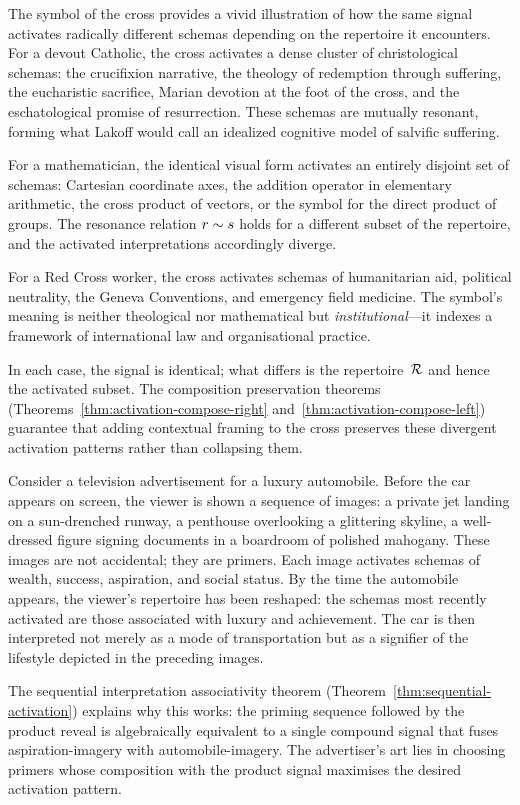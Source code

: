 \begin{example}
\label{ex:cross-multi-activation}
The symbol of the cross provides a vivid illustration of how the same
signal activates radically different schemas depending on the
repertoire it encounters.  For a devout Catholic, the cross activates
a dense cluster of christological schemas: the crucifixion narrative,
the theology of redemption through suffering, the eucharistic
sacrifice, Marian devotion at the foot of the cross, and the
eschatological promise of resurrection.  These schemas are mutually
resonant, forming what Lakoff would call an idealized cognitive model
of salvific suffering.

For a mathematician, the identical visual form activates an entirely
disjoint set of schemas: Cartesian coordinate axes, the addition
operator in elementary arithmetic, the cross product of vectors, or
the symbol for the direct product of groups.  The resonance relation
$r \sim s$ holds for a different subset of the repertoire, and the
activated interpretations accordingly diverge.

For a Red Cross worker, the cross activates schemas of humanitarian
aid, political neutrality, the Geneva Conventions, and emergency field
medicine.  The symbol's meaning is neither theological nor
mathematical but \emph{institutional}---it indexes a framework of
international law and organisational practice.

In each case, the signal is identical; what differs is the
repertoire~$\mathcal{R}$ and hence the activated subset.  The composition
preservation theorems (Theorems~\ref{thm:activation-compose-right}
and~\ref{thm:activation-compose-left}) guarantee that adding
contextual framing to the cross preserves these divergent activation
patterns rather than collapsing them.
\end{example}

\begin{example}
\label{ex:advertising-priming}
Consider a television advertisement for a luxury automobile.  Before
the car appears on screen, the viewer is shown a sequence of images:
a private jet landing on a sun-drenched runway, a penthouse overlooking
a glittering skyline, a well-dressed figure signing documents in a
boardroom of polished mahogany.  These images are not accidental; they
are primers.  Each image activates schemas of wealth, success,
aspiration, and social status.  By the time the automobile appears,
the viewer's repertoire has been reshaped: the schemas most recently
activated are those associated with luxury and achievement.  The car
is then interpreted not merely as a mode of transportation but as a
signifier of the lifestyle depicted in the preceding images.

The sequential interpretation associativity theorem
(Theorem~\ref{thm:sequential-activation}) explains why this works:
the priming sequence followed by the product reveal is algebraically
equivalent to a single compound signal that fuses aspiration-imagery
with automobile-imagery.  The advertiser's art lies in choosing primers
whose composition with the product signal maximises the desired
activation pattern.
\end{example}

